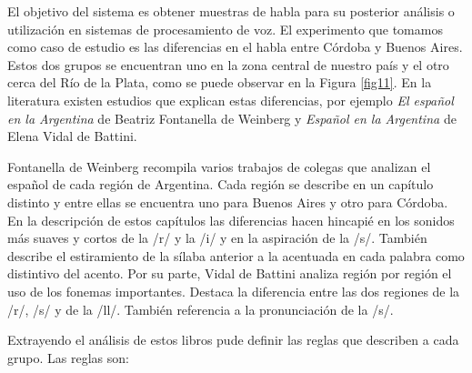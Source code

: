 El objetivo del sistema es obtener muestras de habla para su posterior análisis o utilización en sistemas de procesamiento de voz. El experimento que tomamos como caso de estudio es las diferencias en el habla entre Córdoba y Buenos Aires. Estos dos grupos se encuentran uno en la zona central de nuestro país y el otro cerca del Río de la Plata, como se puede observar en la Figura \ref{fig11}. En la literatura existen estudios que explican estas diferencias, por ejemplo \textit{El español en la Argentina} \cite{Fontanella2000} de Beatriz Fontanella de Weinberg y \textit{Español en la Argentina} \cite{Vidal1964} de Elena Vidal de Battini. 

Fontanella de Weinberg recompila varios trabajos de colegas que analizan el español de cada región de Argentina. Cada región se describe en un capítulo distinto y entre ellas se encuentra uno para Buenos Aires y otro para Córdoba. En la descripción de estos capítulos las diferencias hacen hincapié en los sonidos más suaves y cortos de la /r/ y la /i/ y en la aspiración de la /s/. También describe el estiramiento de la sílaba anterior a la acentuada en cada palabra como distintivo del acento. Por su parte, Vidal de Battini analiza región por región el uso de los fonemas importantes. Destaca la diferencia entre las dos regiones de la /r/, /s/ y de la /ll/. También referencia a la pronunciación de la /s/.

Extrayendo el análisis de estos libros pude definir las reglas que describen a cada grupo. Las reglas son: 

